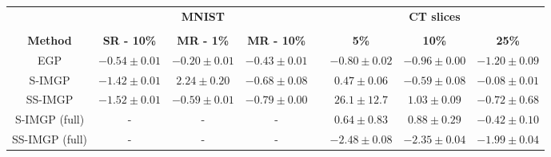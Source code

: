 \documentclass{standalone}
\begin{document}
\begin{tabular}{cccccccc}
    \toprule
                    & \multicolumn{3}{c}{\textbf{MNIST}} &                           & \multicolumn{3}{c}{\textbf{CT slices}}                                                    \\
    \cline{2-4} \cline{6-8}                                                                                                                                                      \\
    \textbf{Method} & \textbf{SR - 10\%}                 & \textbf{MR - 1\%}         & \textbf{MR - 10\%}                     &   & \textbf{5\%} & \textbf{10\%} & \textbf{25\%} \\
    \midrule
    EGP
                    & $-0.54 \pm 0.01$                   & $-0.20 \pm 0.01$          & $-0.43 \pm 0.01$                       &
                    & $-0.80 \pm 0.02$                   & $-0.96 \pm 0.00$          & $-1.20 \pm 0.09$                                                                          \\

    S-IMGP
                    & $-1.42 \pm 0.01$                   & $2.24 \pm 0.20$           & $-0.68 \pm 0.08$                       &
                    & $0.47 \pm 0.06$                    & $-0.59 \pm 0.08$          & $-0.08 \pm 0.01$                                                                          \\

    SS-IMGP
                    & $\mathbf{-1.52 \pm 0.01}$          & $\mathbf{-0.59 \pm 0.01}$ & $\mathbf{-0.79 \pm 0.00}$              &
                    & $ 26.1 \pm 12.7$                   & $ 1.03 \pm 0.09$          & $ -0.72 \pm 0.68$                                                                         \\

    S-IMGP (full)
                    & -                                  & -                         & -                                      &
                    & $0.64 \pm 0.83$                    & $0.88 \pm 0.29$           & $-0.42 \pm 0.10$                                                                          \\

    SS-IMGP (full)
                    & -                                  & -                         & -                                      &
                    & $\mathbf{-2.48 \pm 0.08}$          & $\mathbf{-2.35 \pm 0.04}$ & $\mathbf{-1.99 \pm 0.04}$                                                                 \\
    \bottomrule
\end{tabular}
\end{document}

